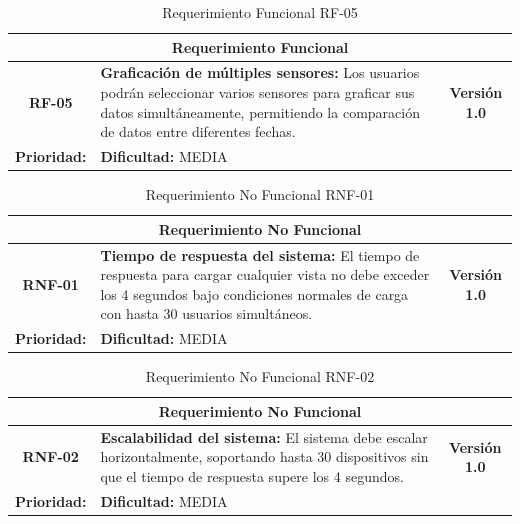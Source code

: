 \begin{table}[h]
\centering
\begin{tabular}{|c|p{10cm}|c|}
\hline
\multicolumn{3}{|c|}{\textbf{Requerimiento Funcional}} \\ \hline
\textbf{RF-05} & \textbf{Graficación de múltiples sensores:} Los usuarios podrán seleccionar varios sensores para graficar sus datos simultáneamente, permitiendo la comparación de datos entre diferentes fechas. & \textbf{Versión 1.0} \\ \hline
\multicolumn{1}{|l|}{\textbf{Prioridad:}} MEDIA & \multicolumn{2}{l|}{\textbf{Dificultad:} MEDIA} \\ \hline
\end{tabular}
\caption{Requerimiento Funcional RF-05}
\end{table}
\renewcommand{\arraystretch}{1.5} %
\begin{table}[h]
\centering
\begin{tabular}{|c|p{10cm}|c|}
\hline
\multicolumn{3}{|c|}{\textbf{Requerimiento No Funcional}} \\ \hline
\textbf{RNF-01} & \textbf{Tiempo de respuesta del sistema:} El tiempo de respuesta para cargar cualquier vista no debe exceder los 4 segundos bajo condiciones normales de carga con hasta 30 usuarios simultáneos. & \textbf{Versión 1.0} \\ \hline
\multicolumn{1}{|l|}{\textbf{Prioridad:}} ALTA & \multicolumn{2}{l|}{\textbf{Dificultad:} MEDIA} \\ \hline
\end{tabular}
\caption{Requerimiento No Funcional RNF-01}
\end{table}
\vspace{1cm} %

\begin{table}[h]
\centering
\begin{tabular}{|c|p{10cm}|c|}
\hline
\multicolumn{3}{|c|}{\textbf{Requerimiento No Funcional}} \\ \hline
\textbf{RNF-02} & \textbf{Escalabilidad del sistema:} El sistema debe escalar horizontalmente, soportando hasta 30 dispositivos sin que el tiempo de respuesta supere los 4 segundos. & \textbf{Versión 1.0} \\ \hline
\multicolumn{1}{|l|}{\textbf{Prioridad:}} ALTA & \multicolumn{2}{l|}{\textbf{Dificultad:} MEDIA} \\ \hline
\end{tabular}
\caption{Requerimiento No Funcional RNF-02}
\end{table}
\vspace{1cm} %

